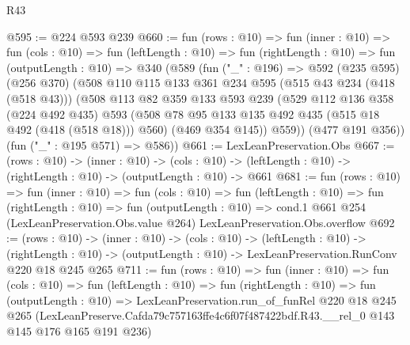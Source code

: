 \begin{lexlean}{R43}
\begin{coremodule}
@595 := @224 @593 @239
@660 := fun (rows : @10) =>
  fun (inner : @10) =>
  fun (cols : @10) =>
  fun (leftLength : @10) =>
  fun (rightLength : @10) =>
  fun (outputLength : @10) =>
  @340
    (@589
      (fun ("_" : @196) =>
      @592
        (@235 @595)
        (@256 @370)
        (@508
          @110
          @115
          @133
          @361
          @234
          @595
          (@515 @43 @234 (@418 (@518 @43)))
          (@508
            @113
            @82
            @359
            @133
            @593
            @239
            (@529
              @112
              @136
              @358
              (@224 @492 @435)
              @593
              (@508 @78 @95 @133 @135 @492 @435 (@515 @18 @492 (@418 (@518 @18))) @560)
              (@469 @354 @145))
            @559))
        (@477 @191 @356))
      (fun ("_" : @195 @571) => @586))
@661 := LexLeanPreservation.Obs
@667 := (rows : @10) ->
  (inner : @10) ->
  (cols : @10) -> (leftLength : @10) -> (rightLength : @10) -> (outputLength : @10) -> @661
@681 := fun (rows : @10) =>
  fun (inner : @10) =>
  fun (cols : @10) =>
  fun (leftLength : @10) =>
  fun (rightLength : @10) =>
  fun (outputLength : @10) =>
  cond.{1} @661 @254 (LexLeanPreservation.Obs.value @264) LexLeanPreservation.Obs.overflow
@692 := (rows : @10) ->
  (inner : @10) ->
  (cols : @10) ->
  (leftLength : @10) ->
  (rightLength : @10) -> (outputLength : @10) -> LexLeanPreservation.RunConv @220 @18 @245 @265
@711 := fun (rows : @10) =>
  fun (inner : @10) =>
  fun (cols : @10) =>
  fun (leftLength : @10) =>
  fun (rightLength : @10) =>
  fun (outputLength : @10) =>
  LexLeanPreservation.run_of_funRel
    @220
    @18
    @245
    @265
    (LexLeanPreserve.Cafda79c757163ffe4c6f07f487422bdf.R43.__rel_0 @143 @145 @176 @165 @191 @236)
\end{coremodule}
\end{lexlean}
